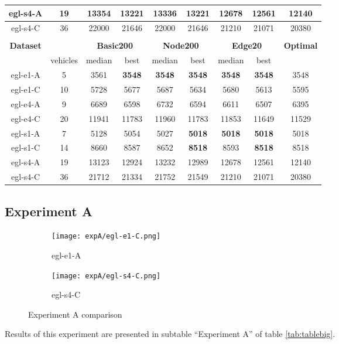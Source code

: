 \documentclass[twoside]{ctuthesis}
\theoremstyle{plain}
\theoremstyle{definition}
\theoremstyle{note}
\begin{document}
\begin{table}[htbp]
\begin{tabular}{|c|c|cc|cc|cc|c|}
		egl-s4-A &19&13354&13221&13336&13221&12678&12561&12140\\ \hline
		egl-s4-C &36&22000&21646&22000&21646&21210&21071&20380\\ \hhline{|=========|}
		\multicolumn{9}{|c|}{\textbf{Experiment C}}\\ 
		\multicolumn{1}{|c}{\textbf{Dataset}}&\multicolumn{1}{c}{}&\multicolumn{2}{c}{\textbf{Basic200}}&\multicolumn{2}{c}{\textbf{Node200}}&\multicolumn{2}{c}{\textbf{Edge20}}&\textbf{Optimal} \\ \hline
		&vehicles&median&best&median&best&median&best&\\ \hline
		egl-e1-A&5&3561&\textbf{3548}&\textbf{3548}&\textbf{3548}&\textbf{3548}&\textbf{3548}&3548\\ \hline
		egl-e1-C&10&5728&5677&5687&5634&5680&5613&5595\\ \hline
		egl-e4-A&9&6689&6598&6732&6594&6611&6507&6395\\ \hline
		egl-e4-C&20&11941&11783&11960&11783&11853&11649&11529\\ \hline
		egl-s1-A&7&5128&5054&5027&\textbf{5018}&\textbf{5018}&\textbf{5018}&5018\\ \hline
		egl-s1-C&14&8660&8587&8652&\textbf{8518}&8593&\textbf{8518}&8518\\ \hline
		egl-s4-A&19&13123&12924&13232&12989&12678&12561&12140\\ \hline
		egl-s4-C&36&21712&21334&21752&21549&21210&21071&20380\\ \hline
	\end{tabular}
\end{table}

\subsection{Experiment A}
\label{exp:expA}

\begin{figure}[htbp]
	\label{fig:expasub}
	\centering
	\begin{subfigure}{0.49\textwidth}
		\centering
		\texttt{[image: expA/egl-e1-C.png]}
		\caption{egl-e1-A}
		\label{fig:subfig1}
	\end{subfigure}
	\hfill
	\begin{subfigure}{0.49\textwidth}
		\centering
		\texttt{[image: expA/egl-s4-C.png]}
		\caption{egl-s4-C}
		\label{fig:subfig2}
	\end{subfigure}
	\caption{Experiment A comparison}
\end{figure}
Results of this experiment are presented in subtable ``Experiment A'' of table \ref{tab:tablebig}. 
\end{document}
